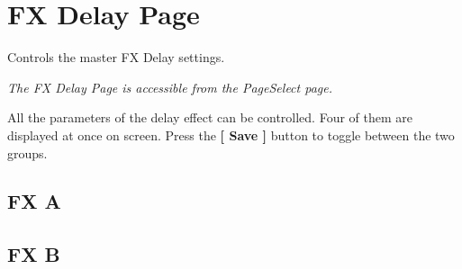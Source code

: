 \chapter{FX Delay Page}


Controls the master FX Delay settings.


\textit{The FX Delay Page is accessible from the PageSelect page.}

All the parameters of the delay effect can be controlled. Four of them are displayed at once on screen. Press the \textbf{[ Save ]} button to toggle between the two groups.

\section{FX A}

\newpage
\section{FX B}

